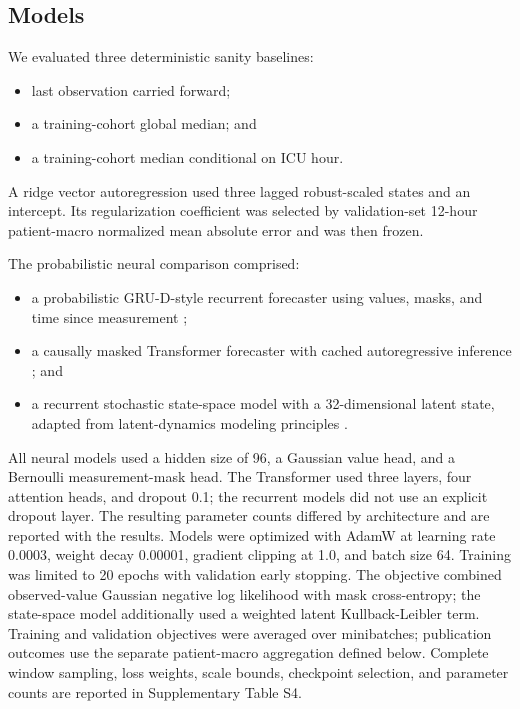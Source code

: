 \documentclass[conference]{IEEEtran}
\providecommand{\tightlist}{%
  \setlength{\itemsep}{0pt}\setlength{\parskip}{0pt}}
\begin{document}
\subsection{Models}\label{models}

We evaluated three deterministic sanity baselines:

\begin{itemize}
\tightlist
\item
  last observation carried forward;
\item
  a training-cohort global median; and
\item
  a training-cohort median conditional on ICU hour.
\end{itemize}

A ridge vector autoregression used three lagged robust-scaled states and an
intercept. Its regularization coefficient was selected by validation-set
12-hour patient-macro normalized mean absolute error and was then frozen.

The probabilistic neural comparison comprised:

\begin{itemize}
\tightlist
\item
  a probabilistic GRU-D-style recurrent forecaster using values, masks, and
  time since measurement \cite{b3};
\item
  a causally masked Transformer forecaster with cached autoregressive inference
  \cite{b4}; and
\item
  a recurrent stochastic state-space model with a 32-dimensional latent state,
  adapted from latent-dynamics modeling principles \cite{b5}.
\end{itemize}

All neural models used a hidden size of 96, a Gaussian value head, and a
Bernoulli measurement-mask head. The Transformer used three layers, four
attention heads, and dropout 0.1; the recurrent models did not use an explicit
dropout layer. The resulting parameter counts differed by architecture and are
reported with the results. Models were optimized with AdamW at learning rate
0.0003, weight decay 0.00001, gradient clipping at 1.0, and batch size 64.
Training was limited to 20 epochs with validation early stopping. The objective
combined observed-value Gaussian negative log likelihood with mask
cross-entropy; the state-space model additionally used a weighted latent
Kullback-Leibler term. Training and validation objectives were averaged over
minibatches; publication outcomes use the separate patient-macro aggregation
defined below. Complete window sampling, loss weights, scale bounds,
checkpoint selection, and parameter counts are reported in Supplementary
Table S4.
\end{document}
